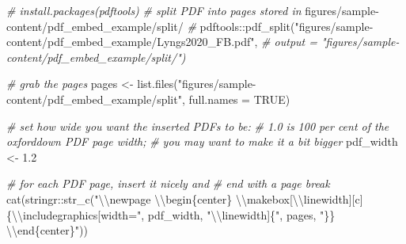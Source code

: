 \documentclass[a4paper, twoside]{templates/ociamthesis}
\newenvironment{Shaded}{\begin{snugshade}}{\end{snugshade}}
\newcommand{\AttributeTok}[1]{\textcolor[rgb]{0.77,0.63,0.00}{#1}}
\newcommand{\CommentTok}[1]{\textcolor[rgb]{0.56,0.35,0.01}{\textit{#1}}}
\newcommand{\ConstantTok}[1]{\textcolor[rgb]{0.00,0.00,0.00}{#1}}
\newcommand{\FloatTok}[1]{\textcolor[rgb]{0.00,0.00,0.81}{#1}}
\newcommand{\FunctionTok}[1]{\textcolor[rgb]{0.00,0.00,0.00}{#1}}
\newcommand{\NormalTok}[1]{#1}
\newcommand{\OtherTok}[1]{\textcolor[rgb]{0.56,0.35,0.01}{#1}}
\newcommand{\SpecialCharTok}[1]{\textcolor[rgb]{0.00,0.00,0.00}{#1}}
\newcommand{\StringTok}[1]{\textcolor[rgb]{0.31,0.60,0.02}{#1}}
\renewenvironment{Shaded}
{
  \vspace{10pt}%
  \begin{snugshade}%
}{%
  \end{snugshade}%
  \vspace{8pt}%
}
\begin{document}
\begin{Shaded}
\begin{Highlighting}[]
\CommentTok{\# install.packages(pdftools)}
\CommentTok{\# split PDF into pages stored in}
\NormalTok{    figures}\SpecialCharTok{/}\NormalTok{sample}\SpecialCharTok{{-}}\NormalTok{content}\SpecialCharTok{/}\NormalTok{pdf\_embed\_example}\SpecialCharTok{/}\NormalTok{split}\SpecialCharTok{/}
\CommentTok{\#}
\NormalTok{    pdftools}\SpecialCharTok{::}\FunctionTok{pdf\_split}\NormalTok{(}\StringTok{"figures/sample{-}content/pdf\_embed\_example/Lyngs2020\_FB.pdf"}\NormalTok{,}
\CommentTok{\# output = "figures/sample{-}content/pdf\_embed\_example/split/")}

\CommentTok{\# grab the pages}
\NormalTok{pages }\OtherTok{\textless{}{-}} \FunctionTok{list.files}\NormalTok{(}\StringTok{"figures/sample{-}content/pdf\_embed\_example/split"}\NormalTok{,}
    \AttributeTok{full.names =} \ConstantTok{TRUE}\NormalTok{)}

\CommentTok{\# set how wide you want the inserted PDFs to be:}
\CommentTok{\# 1.0 is 100 per cent of the oxforddown PDF page width;}
\CommentTok{\# you may want to make it a bit bigger}
\NormalTok{pdf\_width }\OtherTok{\textless{}{-}} \FloatTok{1.2}

\CommentTok{\# for each PDF page, insert it nicely and}
\CommentTok{\# end with a page break}
\FunctionTok{cat}\NormalTok{(stringr}\SpecialCharTok{::}\FunctionTok{str\_c}\NormalTok{(}\StringTok{"}\SpecialCharTok{\textbackslash{}\textbackslash{}}\StringTok{newpage }\SpecialCharTok{\textbackslash{}\textbackslash{}}\StringTok{begin\{center\}}
\StringTok{    }\SpecialCharTok{\textbackslash{}\textbackslash{}}\StringTok{makebox[}\SpecialCharTok{\textbackslash{}\textbackslash{}}\StringTok{linewidth][c]\{}\SpecialCharTok{\textbackslash{}\textbackslash{}}\StringTok{includegraphics[width="}\NormalTok{, pdf\_width,}
    \StringTok{"}\SpecialCharTok{\textbackslash{}\textbackslash{}}\StringTok{linewidth]\{"}\NormalTok{, pages, }\StringTok{"\}\} }\SpecialCharTok{\textbackslash{}\textbackslash{}}\StringTok{end\{center\}"}\NormalTok{))}
\end{Highlighting}
\end{Shaded}
\end{document}
